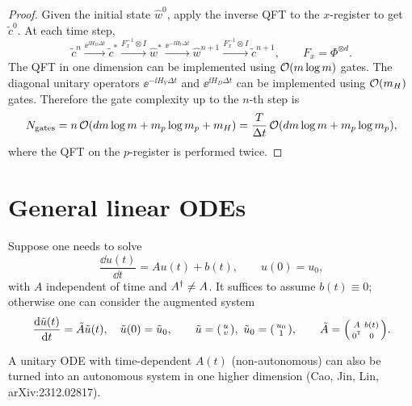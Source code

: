 \begin{proof}
Given the initial state $\hat{w}^0$, apply the inverse QFT to the $x$-register to
get $\tilde{c}^0$. At each time step,
\begin{equation}
  \tilde{c}^n \xrightarrow{\ee^{\ii H_D \Delta t}} \tilde{c}^*
  \xrightarrow{F_x^{-1} \otimes I} \hat{w}^*
  \xrightarrow{\ee^{-\ii H_V \Delta t}} \hat{w}^{n+1}
  \xrightarrow{F_x^{-1} \otimes I} \tilde{c}^{n+1},
  \qquad F_x = \Phi^{\otimes d}.
\end{equation}
The QFT in one dimension can be implemented using $\mathcal{O}(m\log m)$ gates. The
diagonal unitary operators $\ee^{-\ii H_V \Delta t}$ and $\ee^{\ii H_D \Delta t}$
can be implemented using $\mathcal{O}(m_H)$ gates. Therefore the gate complexity up to
the $n$-th step is
\begin{equation}
  N_{\mathrm{gates}} = n\,\mathcal{O}(dm\log m + m_p\log m_p + m_H)
  = \frac{T}{\Delta t}\,\mathcal{O}(dm\log m + m_p\log m_p),
\end{equation}
where the QFT on the $p$-register is performed twice.
\end{proof}

\section{General linear ODEs}\label{sec:sec05-linear-ode}

Suppose one needs to solve
\begin{equation}
  \frac{\dd u(t)}{\dd t} = A u(t) + b(t), \qquad u(0) = u_0,
\end{equation}
with $A$ independent of time and $A^{\dagger} \neq A$. It suffices to assume
$b(t) \equiv 0$; otherwise one can consider the augmented system
\begin{equation}
  \frac{\dd \tilde{u}(t)}{\dd t} = \tilde{A}\tilde{u}(t), \quad \tilde{u}(0) = \tilde{u}_0,
  \qquad \tilde{u} = \begin{psmallmatrix} u \\ v \end{psmallmatrix},\ \tilde{u}_0 = \begin{psmallmatrix} u_0 \\ 1 \end{psmallmatrix},
  \qquad \tilde{A} = \begin{psmallmatrix} A & b(t) \\ 0^{\mathsf{T}} & 0 \end{psmallmatrix}.
\end{equation}

\begin{remark}
A unitary ODE with time-dependent $A(t)$ (non-autonomous) can also be turned into
an autonomous system in one higher dimension (Cao, Jin, Lin, arXiv:2312.02817).
\end{remark}

